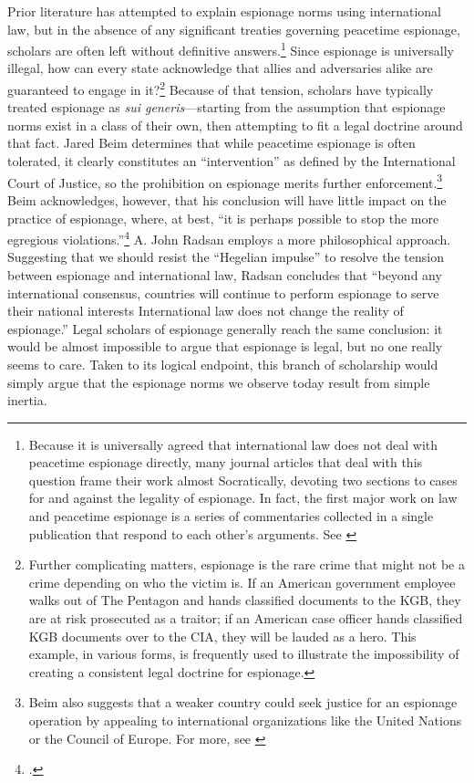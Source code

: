 \documentclass[14pt]{extarticle}
\begin{document}
Prior literature has attempted to explain espionage norms using international law, but in the absence of any significant treaties governing peacetime espionage, scholars are often left without definitive answers.\footnote{Because it is universally agreed that international law does not deal with peacetime espionage directly, many journal articles that deal with this question frame their work almost Socratically, devoting two sections to cases for and against the legality of espionage. In fact, the first major work on law and peacetime espionage is a series of commentaries collected in a single publication that respond to each other's arguments. See \cite{wright_essays_1962}} Since espionage is universally illegal, how can every state acknowledge that allies and adversaries alike are guaranteed to engage in it?\footnote{Further complicating matters, espionage is the rare crime that might not be a crime depending on who the victim is. If an American government employee walks out of The Pentagon and hands classified documents to the KGB, they are at risk prosecuted as a traitor; if an American case officer hands classified KGB documents over to the CIA, they will be lauded as a hero. This example, in various forms, is frequently used to illustrate the impossibility of creating a consistent legal doctrine for espionage.} Because of that tension, scholars have typically treated espionage as \emph{sui generis}---starting from the assumption that espionage norms exist in a class of their own, then attempting to fit a legal doctrine around that fact. Jared Beim determines that while peacetime espionage is often tolerated, it clearly constitutes an \enquote{intervention} as defined by the International Court of Justice, so the prohibition on espionage merits further enforcement.\footnote{Beim also suggests that a weaker country could seek justice for an espionage operation by appealing to international organizations like the United Nations or the Council of Europe. For more, see \cite{beim_enforcing_2018}} Beim acknowledges, however, that his conclusion will have little impact on the practice of espionage, where, at best, \enquote{it is perhaps possible to stop the more egregious violations.}\footcite[p.~672]{beim_enforcing_2018} A. John Radsan employs a more philosophical approach. Suggesting that we should resist the \enquote{Hegelian impulse} to resolve the tension between espionage and international law, Radsan concludes that \enquote{beyond any international consensus, countries will continue to perform espionage to serve their national interests \textelp{} International law does not change the reality of espionage.} Legal scholars of espionage generally reach the same conclusion: it would be almost impossible to argue that espionage is legal, but no one really seems to care. Taken to its logical endpoint, this branch of scholarship would simply argue that the espionage norms we observe today result from simple inertia.
\end{document}
